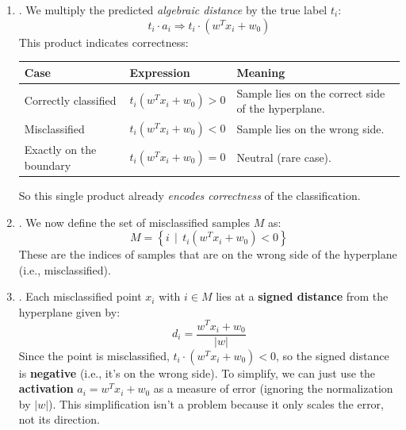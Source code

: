 \begin{enumerate}
    \item {}. We multiply the predicted \emph{algebraic distance} by the true label $t_i$:
    \begin{equation*}
        t_i \cdot a_i \Rightarrow t_i \cdot \left(w^{T} x_i + w_{0}\right)
    \end{equation*}
    This product indicates correctness:
    \begin{table}[!htp]
        \centering
        \begin{tabular}{@{} l l p{12em} @{}}
            \toprule
            \textbf{Case} & \textbf{Expression} & \textbf{Meaning} \\
            \midrule
            Correctly classified    & $t_i \left(w^{T} x_{i} + w_0\right) > 0$ & Sample lies on the correct side of the hyperplane. \\[.3em]
            Misclassified           & $t_i \left(w^{T} x_{i} + w_0\right) < 0$ & Sample lies on the wrong side. \\[.3em]
            Exactly on the boundary & $t_i \left(w^{T} x_{i} + w_0\right) = 0$ & Neutral (rare case). \\
            \bottomrule
        \end{tabular}
    \end{table}

    So this single product already \emph{encodes correctness} of the classification.


    \item {}. We now define the set of misclassified samples $M$ as:
    \begin{equation*}
        M = \left\{ i \, \mid \, t_i \left(w^{T} x_{i} + w_0\right) < 0 \right\}
    \end{equation*}
    These are the indices of samples that are on the wrong side of the hyperplane (i.e., misclassified).


    \item {}. Each misclassified point $x_i$ with $i \in M$ lies at a \textbf{signed distance} from the hyperplane given by:
    \begin{equation*}
        d_i = \dfrac{w^{T} x_i + w_0}{\left|w\right|}
    \end{equation*}
    Since the point is misclassified, $t_i \cdot \left(w^{T} x_i + w_0\right) < 0$, so the signed distance is \textbf{negative} (i.e., it's on the wrong side). To simplify, we can just use the \textbf{activation} $a_i = w^{T} x_i + w_0$ as a measure of error (ignoring the normalization by $\left|w\right|$). This simplification isn't a problem because it only scales the error, not its direction.



\end{enumerate}
